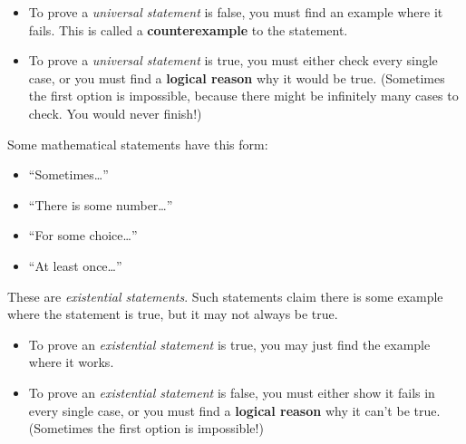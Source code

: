 \begin{itemize}
\item
To prove a \emph{universal statement} is false, you must find an example where it fails.  This is called a {\bf counterexample} to the statement.
\item
To prove a \emph{universal statement} is true, you must either check every single case, or you must find a {\bf logical reason} why it would be true.  (Sometimes the first option is impossible, because there might be infinitely many cases to check.  You would never finish!)
\end{itemize}


Some mathematical statements have this form:
\begin{itemize}
\item
``Sometimes\dots''
\item
``There is some number\dots''
\item
``For some choice\dots''
\item
``At least once\dots''
\end{itemize} 
These are \emph{existential statements}.  Such statements claim there is some example where the statement  is  true, but it may not always be true.  

\begin{itemize}
\item
To prove an \emph{existential statement} is true, you may just find the example where it works.  
\item
To prove an \emph{existential statement} is false, you must either show it fails in every single case, or you must find a {\bf logical reason} why it can't be true.  (Sometimes the first option is impossible!)
\end{itemize}



